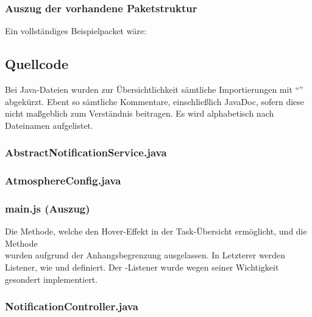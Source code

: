 \subsubsection{Auszug der vorhandene Paketstruktur}
\label{app:Paketstruktur}
Ein vollständiges Beispielpacket wäre: 

\clearpage
\subsection{Quellcode}
\label{app:Quellcode}
Bei Java-Dateien wurden zur Übersichtlichkeit sämtliche Importierungen mit "`"' abgekürzt. Ebent so sämtliche
Kommentare, einschließlich JavaDoc, sofern diese nicht maßgeblich zum Verständnis beitragen. Es wird alphabetisch nach Dateinamen
aufgelistet.

\subsubsection{AbstractNotificationService.java}
\label{app:AbstractNotificationService}


\subsubsection{AtmosphereConfig.java}
\label{app:AtmosphereConfig}


\subsubsection{main.js (Auszug)}
\label{app:main.js}
Die Methode, welche den Hover-Effekt in der Task-Übersicht ermöglicht, und die Methode \\
 wurden aufgrund der Anhangsbegrenzung ausgelassen. In Letzterer werden \sog Listener,
wie  und  definiert. Der -Listener wurde wegen seiner Wichtigkeit
gesondert implementiert.


\subsubsection{NotificationController.java}
\label{app:NotificationController}


